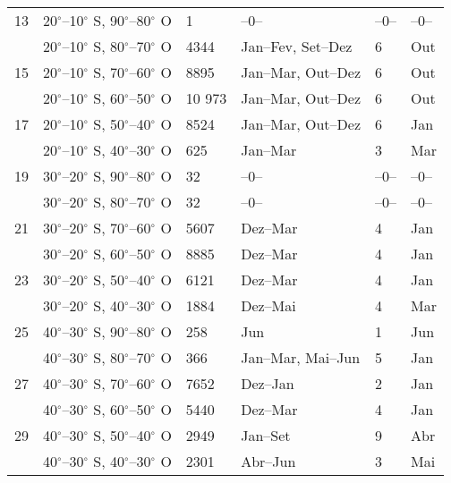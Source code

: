 \begin{table}[!ht]
\begin{tabularx}{\textwidth}{p{0.6cm} p{3.5cm} W W W W}
13&20$^{\circ}$--10$^{\circ}$ S, 90$^{\circ}$--80$^{\circ}$ O& 1  &   --0--  & --0-- & --0-- \\[1.5pt]&20$^{\circ}$--10$^{\circ}$ S, 80$^{\circ}$--70$^{\circ}$ O& 4344 & Jan--Fev,  Set--Dez  &6& Out\\[1.5pt]
15&20$^{\circ}$--10$^{\circ}$ S, 70$^{\circ}$--60$^{\circ}$ O& 8895 & Jan--Mar, Out--Dez &6& Out\\[1.5pt]&20$^{\circ}$--10$^{\circ}$ S, 60$^{\circ}$--50$^{\circ}$ O& 10 973 & Jan--Mar,  Out--Dez &6& Out\\[1.5pt]
17&20$^{\circ}$--10$^{\circ}$ S, 50$^{\circ}$--40$^{\circ}$ O& 8524 & Jan--Mar, Out--Dez &6&  Jan\\[1.5pt]&20$^{\circ}$--10$^{\circ}$ S, 40$^{\circ}$--30$^{\circ}$ O& 625  & Jan--Mar &3&  Mar\\[1.5pt]

19&30$^{\circ}$--20$^{\circ}$ S, 90$^{\circ}$--80$^{\circ}$ O& 32 & --0-- & --0-- &  --0-- \\[1.5pt]&30$^{\circ}$--20$^{\circ}$ S, 80$^{\circ}$--70$^{\circ}$ O& 32 & --0-- &--0--&  --0--\\[1.5pt]
21&30$^{\circ}$--20$^{\circ}$ S, 70$^{\circ}$--60$^{\circ}$ O& 5607 & Dez--Mar &4& Jan\\[1.5pt]&30$^{\circ}$--20$^{\circ}$ S, 60$^{\circ}$--50$^{\circ}$ O& 8885  & Dez--Mar &4& Jan\\[1.5pt]
23&30$^{\circ}$--20$^{\circ}$ S, 50$^{\circ}$--40$^{\circ}$ O& 6121 & Dez--Mar &4& Jan\\[1.5pt]&30$^{\circ}$--20$^{\circ}$ S, 40$^{\circ}$--30$^{\circ}$ O& 1884 & Dez--Mai&4&  Mar\\[1.5pt]

25&40$^{\circ}$--30$^{\circ}$ S, 90$^{\circ}$--80$^{\circ}$ O& 258 & Jun &1&  Jun \\[1.5pt]&40$^{\circ}$--30$^{\circ}$ S, 80$^{\circ}$--70$^{\circ}$ O& 366 & Jan--Mar, Mai--Jun &5& Jan \\[1.5pt]
27&40$^{\circ}$--30$^{\circ}$ S, 70$^{\circ}$--60$^{\circ}$ O& 7652 & Dez--Jan &2&  Jan\\[1.5pt]&40$^{\circ}$--30$^{\circ}$ S, 60$^{\circ}$--50$^{\circ}$ O& 5440 & Dez--Mar  &4&  Jan\\[1.5pt]
29&40$^{\circ}$--30$^{\circ}$ S, 50$^{\circ}$--40$^{\circ}$ O& 2949 & Jan--Set &9&  Abr\\[1.5pt]&40$^{\circ}$--30$^{\circ}$ S, 40$^{\circ}$--30$^{\circ}$ O& 2301 & Abr--Jun  &3& Mai\\[1.5pt]


\hline 
\end{tabularx}
\end{table}

